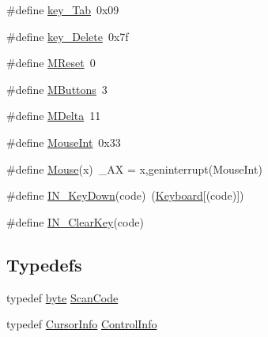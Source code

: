 \begin{DoxyCompactItemize}
\item 
\#define \hyperlink{ID__IN_8H_a0f954c97c2dae0ddda74cb4ecdf3c5c9}{key\_\-Tab}~0x09
\item 
\#define \hyperlink{ID__IN_8H_a9d13b689c474bd57a0ca1f0624d042d6}{key\_\-Delete}~0x7f
\item 
\#define \hyperlink{ID__IN_8H_a57b4d6b42abb5abac156b4e28a5fcfdf}{MReset}~0
\item 
\#define \hyperlink{ID__IN_8H_ab05e3da4f514a6b22b5752a361169045}{MButtons}~3
\item 
\#define \hyperlink{ID__IN_8H_a1795ad7e960197e84346c3cb2e33614b}{MDelta}~11
\item 
\#define \hyperlink{ID__IN_8H_a527075b2ecdd528854c72a142e60c2d8}{MouseInt}~0x33
\item 
\#define \hyperlink{ID__IN_8H_a8b9b10ab48f8d5b6f3e6e083e5e524a7}{Mouse}(x)~\_\-AX = x,geninterrupt(MouseInt)
\item 
\#define \hyperlink{ID__IN_8H_a5ce54ae44f15769cfd7bf96e89620006}{IN\_\-KeyDown}(code)~(\hyperlink{ID__IN_8H_a738773813b02543208fabb69caadefd9}{Keyboard}\mbox{[}(code)\mbox{]})
\item 
\#define \hyperlink{ID__IN_8H_a21bc511a0de7eb91f7e6f16af7a75ffc}{IN\_\-ClearKey}(code)
\end{DoxyCompactItemize}
\subsection*{Typedefs}
\begin{DoxyCompactItemize}
\item 
typedef \hyperlink{ID__HEAD_8H_a0c8186d9b9b7880309c27230bbb5e69d}{byte} \hyperlink{ID__IN_8H_a92ee9291fc7e992c1662c4e195242f2d}{ScanCode}
\item 
typedef \hyperlink{structCursorInfo}{CursorInfo} \hyperlink{ID__IN_8H_ae2fe25e28b168383aaa3ab117709fd1c}{ControlInfo}
\end{DoxyCompactItemize}
